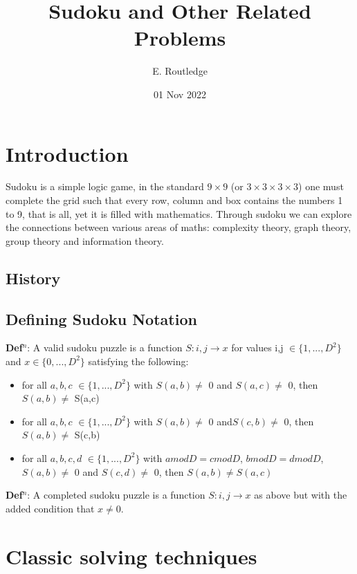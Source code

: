 \documentclass[a4paper,12pt]{article}
\author{E. Routledge}
\date{01 Nov 2022}
\title{Sudoku and Other Related Problems}
\begin{document}
\lstset{language=Python}
\maketitle

\section{Introduction}
		Sudoku is a simple logic game, in the standard $9 \times 9$ (or $3 \times 3 \times 3 \times 3$) 
		one must complete the grid such that every row, column and box contains the numbers 1 to 9, that is all,
		yet it is filled with mathematics. Through sudoku we can explore the connections between various areas of maths: complexity theory, graph theory, group theory and information theory.
	\subsection{History}
	
	\subsection{Defining Sudoku Notation}
	
	\textbf{Def$^n$}: A valid sudoku puzzle is a function $ S: i,j \rightarrow x$ for values i,j $\in \{1,...,D^2\}$ and $x \in \{0,...,D^2\}$ satisfying the following:
\begin{itemize}
	\item{for all $a,b,c$  $\in \{1,...,D^2\}$ with $S(a,b)\neq$ 0 and $S(a,c)\neq$ 0, then $ S(a,b)\neq$ S(a,c) }
	\item{for all $a,b,c$  $\in \{1,...,D^2\}$ with $S(a,b)\neq$ 0 and$ S(c,b)\neq$ 0, then $S(a,b)\neq$ S(c,b) }
	\item{for all $ a,b,c,d $ $\in \{1,...,D^2\}$ with $a mod D = c mod D$, $b mod D  =  d mod D$, $S(a,b)\neq$ 0 and $S(c,d) \neq$ 0, then $S(a,b)\neq S(a,c)$ }
\end{itemize}
\textbf{Def$^n$}: A completed sudoku puzzle is a function $ S: i,j \rightarrow x$ as above but with the added condition that $x \neq 0$.

\section{Classic solving techniques}
\end{document}
